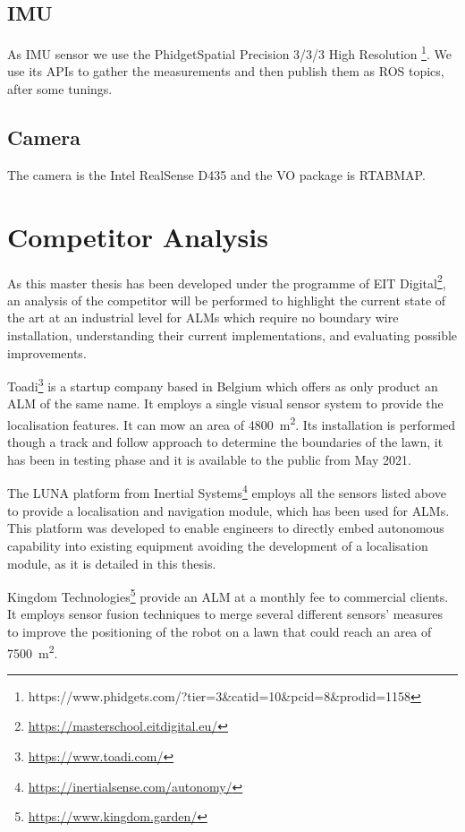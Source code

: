 {\section{IMU}

\noindent
As IMU sensor we use the PhidgetSpatial Precision 3/3/3 High Resolution \footnote{https://www.phidgets.com/?tier=3\&catid=10\&pcid=8\&prodid=1158}.
We use its APIs to gather the measurements and then publish them as ROS topics, after some tunings.

\section{Camera}

\noindent The camera is the Intel RealSense D435 and the \gls{VO} package is \gls{RTABMAP}.

}



\chapter{Competitor Analysis}

\noindent As this master thesis has been developed under the programme of EIT Digital\footnote{\url{https://masterschool.eitdigital.eu/}}, an analysis of the competitor will be performed to highlight the current state of the art at an industrial level for \glspl{ALM} which require no boundary wire installation, understanding their current implementations, and evaluating possible improvements.

Toadi\footnote{\url{https://www.toadi.com/}} is a startup company based in Belgium which offers as only product an \gls{ALM} of the same name. It employs a single visual sensor system to provide the localisation features. It can mow an area of \SI{4800}{\meter\squared}.
Its installation is performed though a track and follow approach to determine the boundaries of the lawn, it has been in testing phase and it is available to the public from May 2021.

The LUNA platform from Inertial Systems\footnote{\url{https://inertialsense.com/autonomy/}} employs all the sensors listed above to provide a localisation and navigation module, which has been used for \glspl{ALM}. This platform was developed to enable engineers to directly embed autonomous capability into existing equipment avoiding the development of a localisation module, as it is detailed in this thesis.

Kingdom Technologies\footnote{\url{https://www.kingdom.garden/}} provide an \gls{ALM} at a monthly fee to commercial clients.
It employs sensor fusion techniques to merge several different sensors' measures to improve the positioning of the robot on a lawn that could reach an area of \SI{7500}{\meter\squared}.

